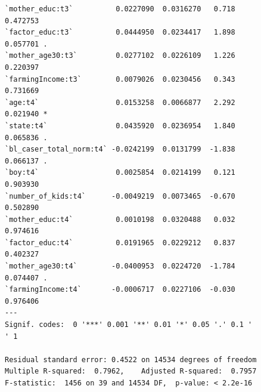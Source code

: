 \documentclass{article}
\begin{document}
\begin{figure}[H]
\begin{lstlisting}[style=RstyleComment, caption=Regression with Demeaned Covariates and Interaction with Treatment]
`mother_educ:t3`          0.0227090  0.0316270   0.718 0.472753    
`factor_educ:t3`          0.0444950  0.0234417   1.898 0.057701 .  
`mother_age30:t3`         0.0277102  0.0226109   1.226 0.220397    
`farmingIncome:t3`        0.0079026  0.0230456   0.343 0.731669    
`age:t4`                  0.0153258  0.0066877   2.292 0.021940 *  
`state:t4`                0.0435920  0.0236954   1.840 0.065836 .  
`bl_caser_total_norm:t4` -0.0242199  0.0131799  -1.838 0.066137 .  
`boy:t4`                  0.0025854  0.0214199   0.121 0.903930    
`number_of_kids:t4`      -0.0049219  0.0073465  -0.670 0.502890    
`mother_educ:t4`          0.0010198  0.0320488   0.032 0.974616    
`factor_educ:t4`          0.0191965  0.0229212   0.837 0.402327    
`mother_age30:t4`        -0.0400953  0.0224720  -1.784 0.074407 .  
`farmingIncome:t4`       -0.0006717  0.0227106  -0.030 0.976406    
---
Signif. codes:  0 '***' 0.001 '**' 0.01 '*' 0.05 '.' 0.1 ' ' 1

Residual standard error: 0.4522 on 14534 degrees of freedom
Multiple R-squared:  0.7962,	Adjusted R-squared:  0.7957 
F-statistic:  1456 on 39 and 14534 DF,  p-value: < 2.2e-16
\end{lstlisting}
\end{figure}
\end{document}
